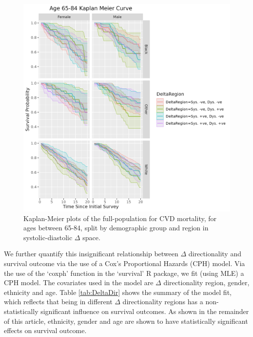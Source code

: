 \documentclass[
]{article}
\begin{document}
\begin{figure}
\centering
\includegraphics{./Rmarkdown_Plots/SurvProbKM_Delta_65-85.png}
\caption{Kaplan-Meier plots of the full-population for CVD mortality, for ages between 65-84, split by demographic group and region in systolic-diastolic \(\Delta\) space.}\label{fig:KM65_deltaregion}
\end{figure}

We further quantify this insignificant relationship between \(\Delta\) directionality and survival outcome via the use of a Cox's Proportional Hazards (CPH) model. Via the use of the `coxph' function in the `survival' R package, we fit (using MLE) a CPH model. The covariates used in the model are \(\Delta\) directionality region, gender, ethnicity and age. Table \ref{tab:DeltaDir} shows the summary of the model fit, which reflects that being in different \(\Delta\) directionality regions has a non-statistically significant influence on survival outcomes. As shown in the remainder of this article, ethnicity, gender and age are shown to have statistically significant effects on survival outcome.
\end{document}
